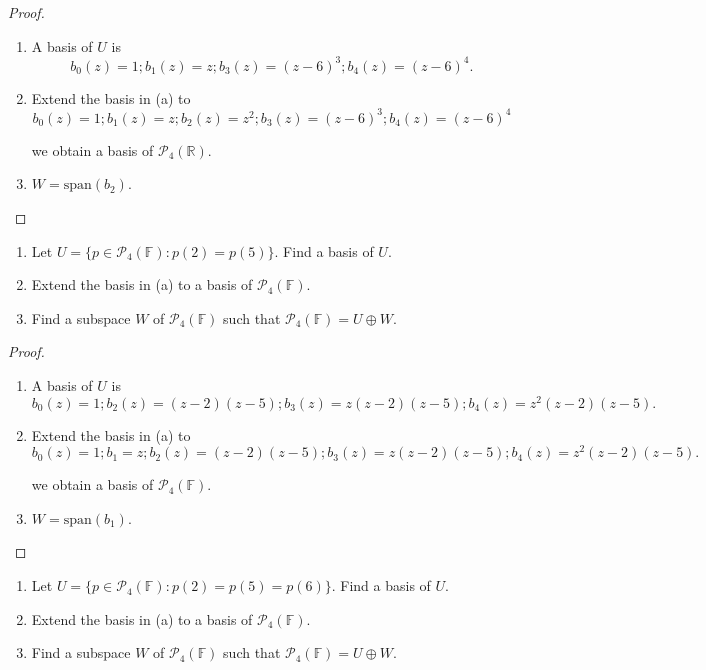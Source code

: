 \begin{proof}
    \begin{enumerate}[label={(\alph*)}]
        \item A basis of $U$ is
              \[
                  b_{0}(z) = 1; b_{1}(z) = z; b_{3}(z) = {(z - 6)}^{3}; b_{4}(z) = {(z - 6)}^{4}.
              \]
        \item Extend the basis in (a) to
              \[
                  b_{0}(z) = 1; b_{1}(z) = z; b_{2}(z) = z^{2}; b_{3}(z) = {(z - 6)}^{3}; b_{4}(z) = {(z - 6)}^{4}
              \]

              we obtain a basis of $\mathcal{P}_{4}(\mathbb{R})$.
        \item $W = \text{span}(b_{2})$.
    \end{enumerate}
\end{proof}

\begin{exercise}
    \begin{enumerate}[label={(\alph*)}]
        \item Let $U = \{ p\in\mathcal{P}_{4}(\mathbb{F}): p(2) = p(5) \}$. Find a basis of $U$.
        \item Extend the basis in (a) to a basis of $\mathcal{P}_{4}(\mathbb{F})$.
        \item Find a subspace $W$ of $\mathcal{P}_{4}(\mathbb{F})$ such that $\mathcal{P}_{4}(\mathbb{F}) = U\oplus W$.
    \end{enumerate}
\end{exercise}

\begin{proof}
    \begin{enumerate}[label={(\alph*)}]
        \item A basis of $U$ is
              \[
                  b_{0}(z) = 1; b_{2}(z) = (z - 2)(z - 5); b_{3}(z) = z(z - 2)(z - 5); b_{4}(z) = z^{2}(z - 2)(z - 5).
              \]
        \item Extend the basis in (a) to
              \[
                  b_{0}(z) = 1; b_{1} = z; b_{2}(z) = (z - 2)(z - 5); b_{3}(z) = z(z - 2)(z - 5); b_{4}(z) = z^{2}(z - 2)(z - 5).
              \]

              we obtain a basis of $\mathcal{P}_{4}(\mathbb{F})$.
        \item $W = \text{span}(b_{1})$.
    \end{enumerate}
\end{proof}

\begin{exercise}
    \begin{enumerate}[label={(\alph*)}]
        \item Let $U = \{ p\in\mathcal{P}_{4}(\mathbb{F}): p(2) = p(5) = p(6) \}$. Find a basis of $U$.
        \item Extend the basis in (a) to a basis of $\mathcal{P}_{4}(\mathbb{F})$.
        \item Find a subspace $W$ of $\mathcal{P}_{4}(\mathbb{F})$ such that $\mathcal{P}_{4}(\mathbb{F}) = U\oplus W$.
    \end{enumerate}
\end{exercise}

